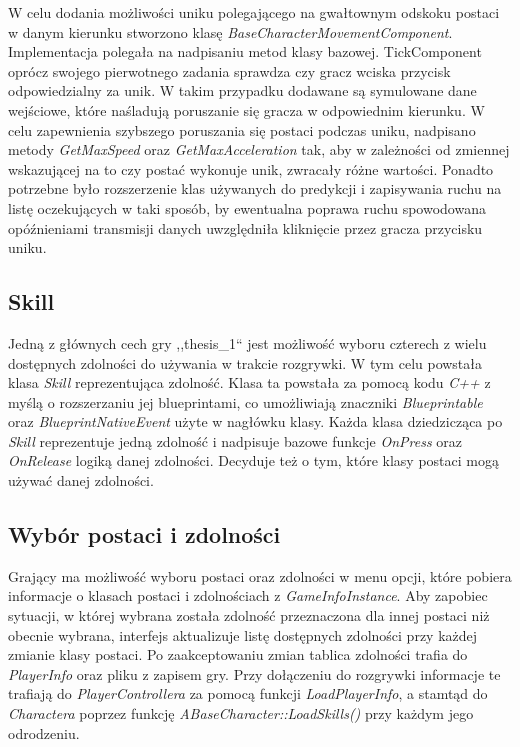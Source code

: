 \documentclass[multip]{SGGW-thesis}
\begin{document}
W celu dodania możliwości uniku polegającego na gwałtownym odskoku postaci w danym kierunku stworzono klasę {\em BaseCharacterMovementComponent}. Implementacja polegała na nadpisaniu metod klasy bazowej\cite{uewiki-charmovement}. TickComponent oprócz swojego pierwotnego zadania sprawdza czy gracz wciska przycisk odpowiedzialny za unik. W takim przypadku dodawane są symulowane dane wejściowe, które naśladują poruszanie się gracza w odpowiednim kierunku. W celu zapewnienia szybszego poruszania się postaci podczas uniku, nadpisano metody {\em GetMaxSpeed} oraz {\em GetMaxAcceleration} tak, aby w zależności od zmiennej wskazującej na to czy postać wykonuje unik, zwracały różne wartości. Ponadto potrzebne było rozszerzenie klas używanych do predykcji i zapisywania ruchu na listę oczekujących w taki sposób, by ewentualna poprawa ruchu spowodowana opóźnieniami transmisji danych uwzględniła kliknięcie przez gracza przycisku uniku.
	\subsection{Skill}
	Jedną z głównych cech gry ,,thesis\_1`` jest możliwość wyboru czterech z wielu dostępnych zdolności do używania w trakcie rozgrywki. W tym celu powstała klasa {\em Skill} reprezentująca zdolność. Klasa ta powstała za pomocą kodu {\em C++} z myślą o rozszerzaniu jej blueprintami, co umożliwiają znaczniki {\em Blueprintable} oraz {\em BlueprintNativeEvent} użyte w nagłówku klasy. Każda klasa dziedzicząca po {\em Skill} reprezentuje jedną zdolność i nadpisuje bazowe funkcje {\em OnPress} oraz {\em OnRelease} logiką danej zdolności. Decyduje też o tym, które klasy postaci mogą używać danej zdolności.
	\subsection{Wybór postaci i zdolności}
		\label{wybor-postaci}
	Grający ma możliwość wyboru postaci oraz zdolności w menu opcji, które pobiera informacje o klasach postaci i zdolnościach z {\em GameInfoInstance}. Aby zapobiec sytuacji, w której wybrana została zdolność przeznaczona dla innej postaci niż obecnie wybrana, interfejs aktualizuje listę dostępnych zdolności przy każdej zmianie klasy postaci. Po zaakceptowaniu zmian tablica zdolności trafia do {\em PlayerInfo} oraz pliku z zapisem gry. Przy dołączeniu do rozgrywki informacje te trafiają do {\em PlayerControllera} za pomocą funkcji {\em LoadPlayerInfo}, a stamtąd do {\em Charactera} poprzez funkcję {\em ABaseCharacter::LoadSkills()} przy każdym jego odrodzeniu.
\end{document}
